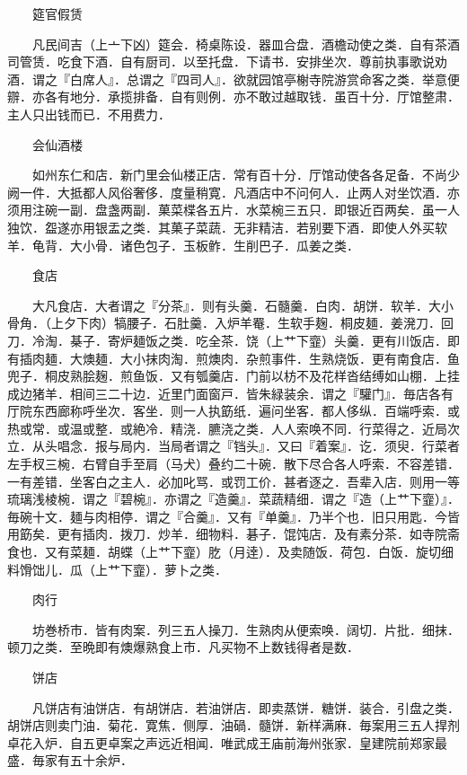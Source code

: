 　　筵官假赁

　　凡民间吉（上亠下凶）筵会．椅桌陈设．器皿合盘．酒檐动使之类．自有茶酒司管赁．吃食下酒．自有厨司．以至托盘．下请书．安排坐次．尊前执事歌说劝酒．谓之『白席人』．总谓之『四司人』．欲就园馆亭榭寺院游赏命客之类．举意便辧．亦各有地分．承揽排备．自有则例．亦不敢过越取钱．虽百十分．厅馆整肃．主人只出钱而已．不用费力．

　　会仙酒楼

　　如州东仁和店．新门里会仙楼正店．常有百十分．厅馆动使各各足备．不尚少阙一件．大抵都人风俗奢侈．度量稍寛．凡酒店中不问何人．止两人对坐饮酒．亦须用注碗一副．盘盏两副．菓菜楪各五片．水菜椀三五只．即银近百两矣．虽一人独饮．盌遂亦用银盂之类．其菓子菜蔬．无非精洁．若别要下酒．即使人外买软羊．龟背．大小骨．诸色包子．玉板鲊．生削巴子．瓜姜之类．

　　食店

　　大凡食店．大者谓之『分茶』．则有头羹．石髓羹．白肉．胡饼．软羊．大小骨角．（上夕下肉）犒腰子．石肚羹．入炉羊罨．生软手麹．桐皮麺．姜溌刀．回刀．冷淘．棊子．寄炉麺饭之类．吃全茶．饶（上艹下韲）头羹．更有川饭店．即有插肉麺．大燠麺．大小抹肉淘．煎燠肉．杂煎事件．生熟烧饭．更有南食店．鱼兜子．桐皮熟脍麹．煎鱼饭．又有瓠羹店．门前以枋不及花样沓结缚如山棚．上挂成边猪羊．相间三二十边．近里门面窗戸．皆朱緑装余．谓之『驩门』．毎店各有厅院东西廊称呼坐次．客坐．则一人执筯纸．遍问坐客．都人侈纵．百端呼索．或热或常．或温或整．或絶冷．精浇．臕浇之类．人人索唤不同．行菜得之．近局次立．从头唱念．报与局内．当局者谓之『铛头』．又曰『着案』．讫．须臾．行菜者左手杈三椀．右臂自手至肩（马犬）叠约二十碗．散下尽合各人呼索．不容差错．一有差错．坐客白之主人．必加叱骂．或罚工价．甚者逐之．吾辈入店．则用一等琉璃浅棱椀．谓之『碧椀』．亦谓之『造羹』．菜蔬精细．谓之『造（上艹下韲）』．毎碗十文．麺与肉相停．谓之『合羹』．又有『单羹』．乃半个也．旧只用匙．今皆用筯矣．更有插肉．拨刀．炒羊．细物料．碁子．馄饨店．及有素分茶．如寺院斋食也．又有菜麺．胡蝶（上艹下韲）肐（月逹）．及卖随饭．荷包．白饭．旋切细料馉饳儿．瓜（上艹下韲）．萝卜之类．

　　肉行

　　坊巻桥市．皆有肉案．列三五人操刀．生熟肉从便索唤．阔切．片批．细抹．顿刀之类．至晩即有燠爆熟食上市．凡买物不上数钱得者是数．

　　饼店

　　凡饼店有油饼店．有胡饼店．若油饼店．即卖蒸饼．糖饼．装合．引盘之类．胡饼店则卖门油．菊花．寛焦．侧厚．油碢．髓饼．新样满麻．毎案用三五人捍剂卓花入炉．自五更卓案之声远近相闻．唯武成王庙前海州张家．皇建院前郑家最盛．毎家有五十余炉．

